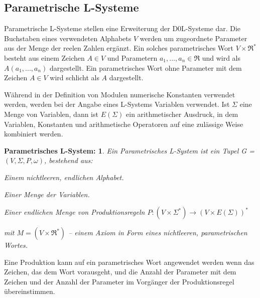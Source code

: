 \subsection{Parametrische L-Systeme}

Parametrische L-Systeme stellen eine Erweiterung der D0L-Systeme dar. Die Buchstaben eines verwendeten Alphabets $V$ werden um zugeordnete Parameter aus der Menge der reelen Zahlen ergänzt. Ein solches parametrisches Wort $V \times \Re^*$ besteht aus einem Zeichen $A \in V$ und Parametern $a_1,...,a_n \in \Re$ und wird als $A(a_1,...,a_n)$ dargestellt. Ein parametrisches Wort ohne Parameter mit dem Zeichen $A \in V$  wird schlicht als $A$ dargestellt. \cite[S.41]{ABOP:04}

Während in der Definition von Modulen numerische Konstanten verwendet werden, werden bei der Angabe eines L-Systems Variablen verwendet. Ist $\Sigma$ eine Menge von Variablen, dann ist $E(\Sigma)$ ein arithmetischer Ausdruck, in dem Variablen, Konstanten und arithmetische Operatoren auf eine zulässige Weise kombiniert werden. \cite[S.41]{ABOP:04}

\newtheorem{defParametrischeLSysteme}{Parametrisches L-System:}[section]
\begin{defParametrischeLSysteme}
	Ein Parametrisches L-System ist ein Tupel G = $(V, \Sigma, P, \omega)$, bestehend aus:
	\begin{description}[labelindent]
		\item[\boldmath$V$] Einem nichtleeren, endlichen Alphabet.\\
		
		\item[\boldmath$\Sigma$] Einer Menge der Variablen.\\
		
		\item[\boldmath$P$] Einer endlichen Menge von Produktionsregeln $P : (V\times \Sigma^*) \rightarrow (V\times E(\Sigma))^*$\\
		
		\item[\boldmath$\omega \in M^+$] mit $M =(V \times \Re^*)$ -- einem Axiom in Form eines nichtleeren, parametrischen Wortes.
	\end{description}
\cite[S.41]{ABOP:04}
\end{defParametrischeLSysteme}

Eine Produktion kann auf ein parametrisches Wort angewendet werden wenn das Zeichen, das dem Wort vorausgeht, und die Anzahl der Parameter mit dem Zeichen und der Anzahl der Parameter im Vorgänger der Produktionsregel übereinstimmen. \cite[S.42]{ABOP:04}


